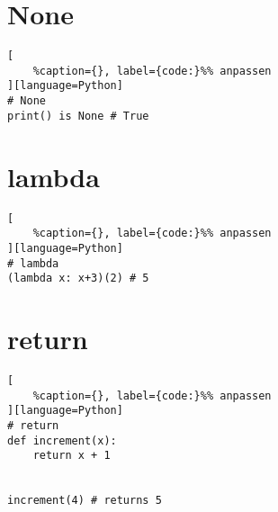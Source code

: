 \section{None}\label{none}

\lstset{language=Python}%
\begin{lstlisting}[
	%caption={}, label={code:}%% anpassen
][language=Python]
# None
print() is None # True
\end{lstlisting}

\section{lambda}\label{lambda}

\lstset{language=Python}%
\begin{lstlisting}[
	%caption={}, label={code:}%% anpassen
][language=Python]
# lambda
(lambda x: x+3)(2) # 5
\end{lstlisting}

\section{return}\label{return}

\lstset{language=Python}%
\begin{lstlisting}[
	%caption={}, label={code:}%% anpassen
][language=Python]
# return
def increment(x):
    return x + 1

    
increment(4) # returns 5
\end{lstlisting}
